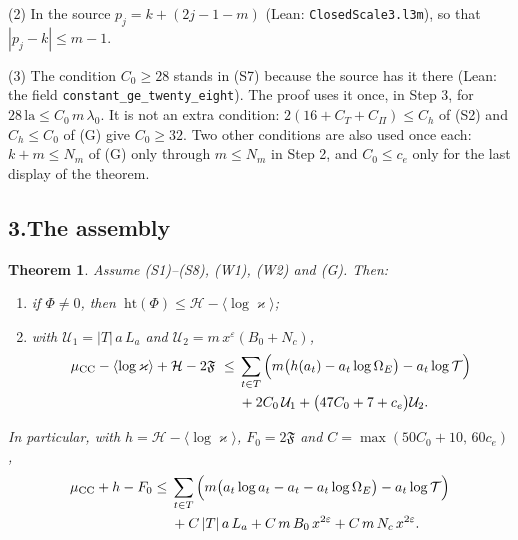 \documentclass[11pt,letterpaper]{article}
\newtheorem{theorem}{Theorem}[section]
\begin{document}
(2) In the source $p_j=k+(2j-1-m)$ (Lean: \texttt{ClosedScale3.l3m}), so that $|p_j-k|\le m-1$.

(3) The condition $C_0\ge28$ stands in (S7) because the source has it there (Lean: the field
\texttt{constant\_ge\_twenty\_eight}). The proof uses it once, in Step 3, for
$28\,\mathrm{la}\le C_0\,m\,\lambda_0$. It is not an extra condition: $2(16+C_T+C_\Pi)\le C_h$ of (S2) and
$C_h\le C_0$ of (G) give $C_0\ge32$. Two other conditions are also used once each: $k+m\le N_m$ of (G)
only through $m\le N_m$ in Step 2, and $C_0\le c_e$ only for the last display of the theorem.

\subsection*{3.\quad The assembly}

\begin{theorem}\label{sa:thm}
Assume \textup{(S1)--(S8)}, \textup{(W1)}, \textup{(W2)} and \textup{(G)}. Then:
\begin{enumerate}[label=\textup{(\alph*)},leftmargin=2.4em,itemsep=2pt,topsep=3pt]
\item if $\Phi\ne0$, then $\ \mathrm{ht}(\Phi)\le\mathcal H-\langle\log\varkappa\rangle$;
\item with $\mathcal U_1=|T|\,a\,L_a$ and $\mathcal U_2=m\,x^{\varepsilon}(B_0+N_c)$,
\begin{equation}\label{D:263}
\begin{aligned}
 \mu_{\rm CC}-\langle\log\varkappa\rangle+\mathcal H-2\mathfrak F\ \le{}&
 \sum_{t\in T}\Big(m\big(h(a_t)-a_t\log\Omega_E\big)-a_t\log\mathcal T\Big)\\
 &+2C_0\,\mathcal U_1+\big(47C_0+7+c_e\big)\mathcal U_2 .
\end{aligned}
\end{equation}
\end{enumerate}
In particular, with $h=\mathcal H-\langle\log\varkappa\rangle$, $F_0=2\mathfrak F$ and
$C=\max(50C_0+10,\,60c_e)$,
\begin{equation}\label{D:264}
\begin{aligned}
 \mu_{\rm CC}+h-F_0\le{}&\sum_{t\in T}\Big(m\big(a_t\log a_t-a_t-a_t\log\Omega_E\big)-a_t\log\mathcal T\Big)\\
 &+C\,|T|\,a\,L_a+C\,m\,B_0\,x^{2\varepsilon}+C\,m\,N_c\,x^{2\varepsilon}.
\end{aligned}
\end{equation}
\end{theorem}
\end{document}
